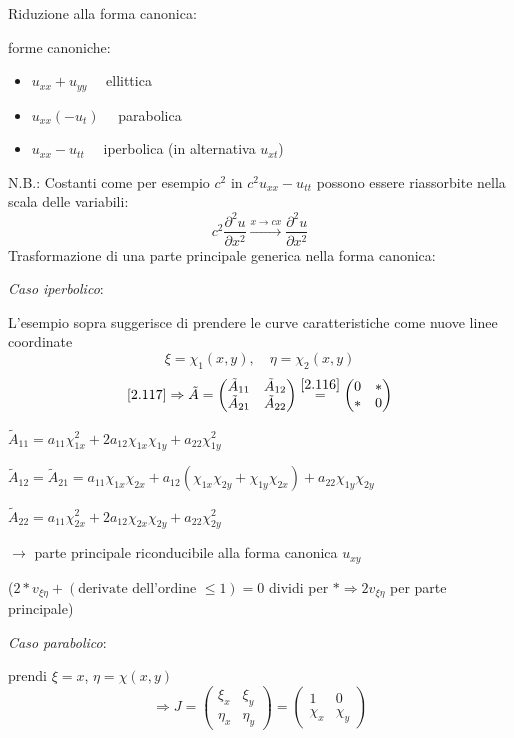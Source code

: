 \documentclass[a4paper,11pt]{report}
\begin{document}
Riduzione alla forma canonica:

forme canoniche:
\begin{itemize}
\item[] $u_{xx} + u_{yy} \quad$ ellittica
\item[] $u_{xx} (- u_t) \quad$ parabolica
\item[] $u_{xx} - u_{tt} \quad$ iperbolica (in alternativa $u_{xt}$)
\end{itemize}
N.B.: Costanti come per esempio $c^2$ in $c^2 u_{xx}-u_{tt}$ possono essere riassorbite nella scala delle variabili:
\[
c^2 \frac{\partial^2 u}{\partial x^2} \overset{x\to cx}{\longrightarrow} \frac{\partial^2 u}{\partial x^2}
\]
Trasformazione di una parte principale generica nella forma canonica:

\medskip

\emph{Caso iperbolico}:

L'esempio sopra suggerisce di prendere le curve caratteristiche come nuove linee coordinate 
\[
\xi=\chi_1(x,y),\quad \eta=\chi_2(x,y)
\]
\[
\eqref{2.117}\Rightarrow \tilde{A} = \left(\begin{matrix}
\tilde{A}_{11} & \tilde{A}_{12} \\
\tilde{A}_{21} & \tilde{A}_{22}
\end{matrix} \right)\overset{\eqref{2.116}}{=}\left(\begin{matrix}
0 & *\\
* & 0
\end{matrix}\right)
\]

$\tilde{A}_{11}=a_{11}\chi_{1x}^2 + 2a_{12}\chi_{1x}\chi_{1y} + a_{22}\chi_{1y}^2$

$\tilde{A}_{12}=\tilde{A}_{21}=a_{11}\chi_{1x}\chi_{2x} + a_{12}(\chi_{1x}\chi_{2y} + \chi_{1y}\chi_{2x}) + a_{22}\chi_{1y}\chi_{2y}$

$\tilde{A}_{22}=a_{11}\chi_{2x}^2 + 2a_{12}\chi_{2x}\chi_{2y} + a_{22}\chi_{2y}^2$

$\rightarrow$ parte principale riconducibile alla forma canonica $u_{xy}$ 

($2 * v_{\xi\eta} + (\text{derivate dell'ordine }\leq1) =0$ dividi per $* \Rightarrow 2v_{\xi \eta}$ per parte principale)

\medskip

\emph{Caso parabolico}:

prendi $\xi=x$, $\eta=\chi(x,y)$
\[
\Rightarrow J=\left(\begin{matrix}
\xi_x & \xi_y \\
\eta_x & \eta_y
\end{matrix}\right)=\left( \begin{matrix}
1 & 0\\
\chi_{x} & \chi_y
\end{matrix}\right)
\]
\end{document}
